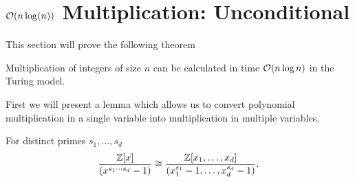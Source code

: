 


\section{$\mathcal O(n\log(n))$ Multiplication: Unconditional}
\label{subsec:nlogn}

This section will prove the following theorem

\begin{theorem}\label{thm:main-theorem}
    \smallskip

    Multiplication of integers of size $n$ can be calculated in time $\mathcal O(n \log n)$ in the Turing model.
\end{theorem}

First we will present a lemma which allows us to convert polynomial multiplication in a single variable into multiplication in multiple variables.

\begin{lemma}\label{eq:uni-to-multi}
    For distinct primes $s_1, \ldots, s_d$
    \begin{equation}\label{eq:multi-dft}
        \frac{{\mathbb Z}[x]}{(x^{s_1\cdots s_d} - 1)} \cong \frac{{\mathbb Z}[x_1, \ldots, x_d]}{(x_1^{s_1} - 1, \ldots, x_d^{s_d} - 1)}.
    \end{equation}
\end{lemma}

